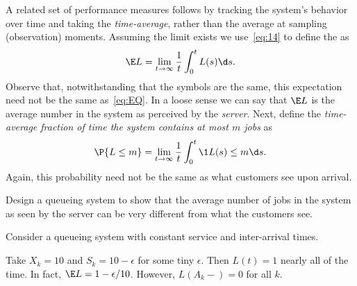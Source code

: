 A related set of performance measures follows by tracking the system's behavior over time and taking the \emph{time-average}, rather than the average at sampling (observation) moments.
Assuming the limit exists we use~\cref{eq:14} to define the  as
\begin{equation}
 \label{eq:46}
 \E L = \lim_{t\to\infty} \frac 1 t\int_0^t L(s) \d s.
\end{equation}
Observe that, notwithstanding that the symbols are the same, this expectation need not be the same as~\cref{eq:EQ}.
In a loose sense we can say that $\E L$ is the average number in the system as perceived by the \emph{server}.
Next, define the \emph{time-average fraction of time the system contains at most $m$ jobs} as
\begin{equation}
 \label{eq:47}
 \P{L\leq m} =\lim_{t\to\infty} \frac 1 t\int_0^t \1{L(s)\leq m} \d s.
\end{equation}
Again, this probability need not be the same as what customers see upon arrival.


\begin{exercise}
Design a queueing system to show that the average number of jobs in the system as seen by the server can be very different from what the customers see.
\begin{hint}
Consider a queueing system with constant service and inter-arrival times.
\end{hint}
\begin{solution}
 Take $X_k = 10$ and $S_k = 10-\epsilon$ for some tiny
 $\epsilon$. Then $L(t) = 1$ nearly all of the time. In fact,
 $\E L = 1-\epsilon/10$. However, $L(A_k-)=0$ for all $k$.
\end{solution}
\end{exercise}



